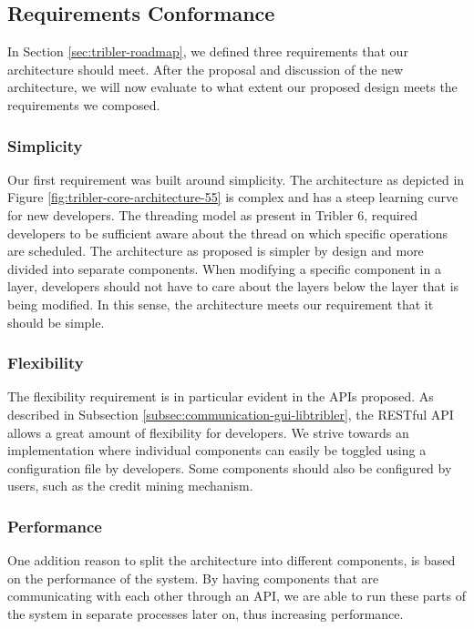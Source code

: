 
\subsection{Requirements Conformance}
In Section \ref{sec:tribler-roadmap}, we defined three requirements that our architecture should meet. After the proposal and discussion of the new architecture, we will now evaluate to what extent our proposed design meets the requirements we composed.

\subsubsection{\textbf{Simplicity}}
Our first requirement was built around simplicity. The architecture as depicted in Figure \ref{fig:tribler-core-architecture-55} is complex and has a steep learning curve for new developers. The threading model as present in Tribler 6, required developers to be sufficient aware about the thread on which specific operations are scheduled. The architecture as proposed is simpler by design and more divided into separate components. When modifying a specific component in a layer, developers should not have to care about the layers below the layer that is being modified. In this sense, the architecture meets our requirement that it should be simple.

\subsubsection{\textbf{Flexibility}}
The flexibility requirement is in particular evident in the APIs proposed. As described in Subsection \ref{subsec:communication-gui-libtribler}, the RESTful API allows a great amount of flexibility for developers. We strive towards an implementation where individual components can easily be toggled using a configuration file by developers. Some components should also be configured by users, such as the credit mining mechanism.

\subsubsection{\textbf{Performance}}
One addition reason to split the architecture into different components, is based on the performance of the system. By having components that are communicating with each other through an API, we are able to run these parts of the system in separate processes later on, thus increasing performance.